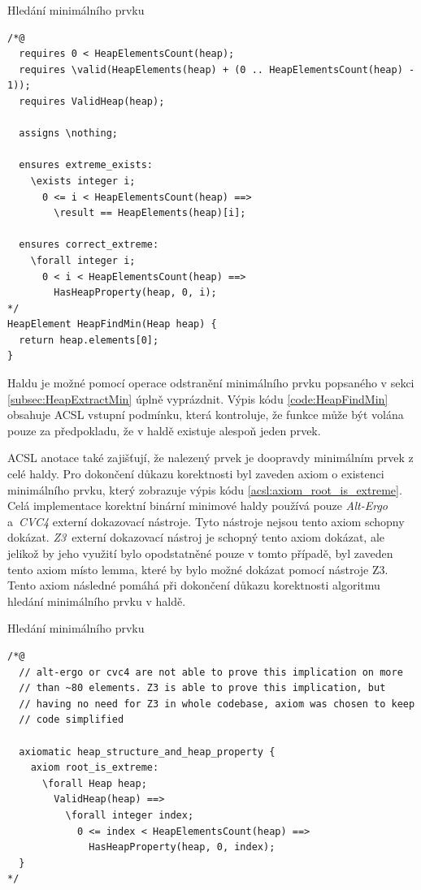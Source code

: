 \begin{listing}[H]
	\caption{Hledání minimálního prvku}
	\label{code:HeapFindMin}
	\begin{verbatim}
/*@
  requires 0 < HeapElementsCount(heap);
  requires \valid(HeapElements(heap) + (0 .. HeapElementsCount(heap) - 1));
  requires ValidHeap(heap);

  assigns \nothing;

  ensures extreme_exists:
    \exists integer i;
      0 <= i < HeapElementsCount(heap) ==>
        \result == HeapElements(heap)[i];

  ensures correct_extreme:
    \forall integer i;
      0 < i < HeapElementsCount(heap) ==>
        HasHeapProperty(heap, 0, i);
*/
HeapElement HeapFindMin(Heap heap) {
  return heap.elements[0];
}
	\end{verbatim}
\end{listing}

Haldu je možné pomocí operace odstranění minimálního prvku popsaného v sekci \ref{subsec:HeapExtractMin} úplně vyprázdnit. Výpis kódu \ref{code:HeapFindMin} obsahuje ACSL vstupní podmínku, která kontroluje, že funkce může být volána pouze za předpokladu, že v haldě existuje alespoň jeden prvek.

ACSL anotace také zajišťují, že nalezený prvek je doopravdy minimálním prvek z celé haldy. Pro dokončení důkazu korektnosti byl zaveden axiom o existenci minimálního prvku, který zobrazuje výpis kódu \ref{acsl:axiom_root_is_extreme}. Celá implementace korektní binární minimové haldy používá pouze \mbox{\textit{Alt-Ergo}} a~\textit{CVC4} externí dokazovací nástroje. Tyto nástroje nejsou tento axiom schopny dokázat. \textit{Z3}~externí dokazovací nástroj je schopný tento axiom dokázat, ale jelikož by jeho využití bylo opodstatněné pouze v tomto případě, byl zaveden tento axiom místo lemma, které by bylo možné dokázat pomocí nástroje Z3. Tento axiom následné pomáhá při dokončení důkazu korektnosti algoritmu hledání minimálního prvku v haldě.

\begin{listing}[H]
	\caption{Hledání minimálního prvku}
	\label{acsl:axiom_root_is_extreme}
	\begin{verbatim}
/*@
  // alt-ergo or cvc4 are not able to prove this implication on more
  // than ~80 elements. Z3 is able to prove this implication, but
  // having no need for Z3 in whole codebase, axiom was chosen to keep
  // code simplified

  axiomatic heap_structure_and_heap_property {
    axiom root_is_extreme:
      \forall Heap heap;
        ValidHeap(heap) ==>
          \forall integer index;
            0 <= index < HeapElementsCount(heap) ==>
              HasHeapProperty(heap, 0, index);
  }
*/
	\end{verbatim}
\end{listing}

